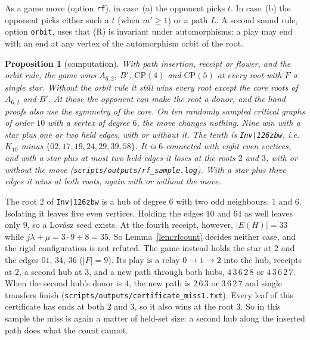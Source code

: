 \documentclass[11pt]{amsart}
\newtheorem{proposition}[theorem]{Proposition}
\theoremstyle{definition}
\begin{document}
As a game move (option \texttt{rf}), in case~(a) the opponent picks $t$. In case~(b) the opponent
picks either such a $t$ (when $m'\ge1$) or a path $L$. A second sound rule, option \texttt{orbit},
uses that (R) is invariant under automorphisms: a play may end with an end at any vertex of the
automorphism orbit of the root.

\begin{proposition}[computation]\label{prop:rfgame}
With path insertion, receipt or flower, and the orbit rule, the game wins $A_{6,2}$, $B'$,
$\mathrm{CP}(4)$ and $\mathrm{CP}(5)$ at every root with $F$ a single star. Without the orbit rule
it still wins every root except the core roots of $A_{6,2}$ and $B'$. At those the opponent can
make the root a donor, and the hand proofs also use the symmetry of the core. On ten randomly
sampled critical graphs of order $10$ with a vertex of degree $6$, the move changes nothing. Nine
win with a star plus one or two held edges, with or without it. The tenth is
\texttt{Inv|\char126zbw}, i.e.\ $K_{10}$ minus $\{02,17,19,24,29,39,58\}$. It is
$6$-connected with eight even vertices, and with a star plus at most two held edges it loses at
the roots $2$ and $3$, with or without the move (\texttt{scripts/outputs/rf\_sample.log}). With a
star plus three edges it wins at both roots, again with or without the move.
\end{proposition}

The root $2$ of \texttt{Inv|\char126zbw} is a hub of degree $6$ with two odd neighbours,
$1$ and $6$. Isolating it leaves five even vertices. Holding the edges $10$ and $64$ as well leaves
only $9$, so a Lov\'asz seed exists. At the fourth receipt, however, $|E(H)|=33$ while
$j\lambda+\mu=3\cdot9+8=35$. So Lemma~\ref{lem:rfcount} decides neither case, and the rigid
configuration is not refuted. The game instead holds the star at $2$ and the edges $01$, $34$,
$36$ ($|F|=9$). Its play is a relay $0\to1\to2$ into the hub, receipts at $2$, a second hub at
$3$, and a new path through both hubs, $4\,3\,6\,2\,8$ or $4\,3\,6\,2\,7$. When the second
hub's donor is $4$, the new path is $2\,6\,3$ or $3\,6\,2\,7$ and single transfers finish
(\texttt{scripts/outputs/certificate\_miss1.txt}). Every leaf of this certificate has ends at both
$2$ and $3$, so it also wins at the root $3$. So in this sample the miss is again a matter of
held-set size: a second hub along the inserted path does what the count cannot.
\end{document}

